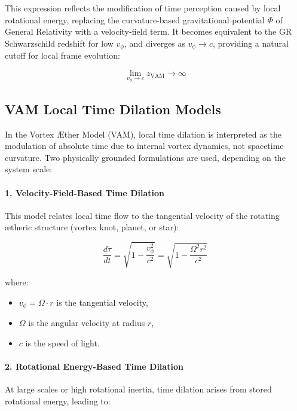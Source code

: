 This expression reflects the modification of time perception caused by local rotational energy, replacing the curvature-based gravitational potential \( \Phi \) of General Relativity with a velocity-field term. It becomes equivalent to the GR Schwarzschild redshift for low \( v_\phi \), and diverges as \( v_\phi \rightarrow c \), providing a natural cutoff for local frame evolution:

\begin{equation}
    \lim_{v_\phi \to c} z_{\text{VAM}} \to \infty
\end{equation}

\subsection*{VAM Local Time Dilation Models}

In the Vortex Æther Model (VAM), local time dilation is interpreted as the modulation of absolute time due to internal vortex dynamics, not spacetime curvature. Two physically grounded formulations are used, depending on the system scale:

\paragraph{1. Velocity-Field-Based Time Dilation}

This model relates local time flow to the tangential velocity of the rotating ætheric structure (vortex knot, planet, or star):

\begin{equation}
    \frac{d\tau}{dt} =
    \sqrt{1 - \frac{v_\phi^2}{c^2}} =
    \sqrt{1 - \frac{\Omega^2 r^2}{c^2}}
\end{equation}

where:
\begin{itemize}
    \item \( v_\phi = \Omega \cdot r \) is the tangential velocity,
    \item \( \Omega \) is the angular velocity at radius \( r \),
    \item \( c \) is the speed of light.
\end{itemize}

\paragraph{2. Rotational Energy-Based Time Dilation}

At large scales or high rotational inertia, time dilation arises from stored rotational energy, leading to:

